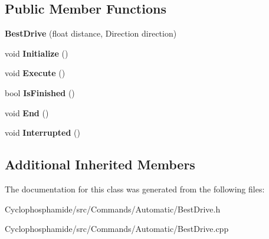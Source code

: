 \subsection*{Public Member Functions}
\begin{DoxyCompactItemize}
\item 
\hypertarget{class_best_drive_aa1ddc3e387fa0eed5941a52dcb4f5dd6}{}{\bfseries Best\+Drive} (float distance, Direction direction)\label{class_best_drive_aa1ddc3e387fa0eed5941a52dcb4f5dd6}

\item 
\hypertarget{class_best_drive_a1837e8ae6f533835175e3014ec959d9b}{}void {\bfseries Initialize} ()\label{class_best_drive_a1837e8ae6f533835175e3014ec959d9b}

\item 
\hypertarget{class_best_drive_a5d3e4b21cfcb5a719a4f3aa347c24784}{}void {\bfseries Execute} ()\label{class_best_drive_a5d3e4b21cfcb5a719a4f3aa347c24784}

\item 
\hypertarget{class_best_drive_a0ddfa6d57679ca2709ff751019102229}{}bool {\bfseries Is\+Finished} ()\label{class_best_drive_a0ddfa6d57679ca2709ff751019102229}

\item 
\hypertarget{class_best_drive_a6aa048014fa7605362f58eb8d92031cc}{}void {\bfseries End} ()\label{class_best_drive_a6aa048014fa7605362f58eb8d92031cc}

\item 
\hypertarget{class_best_drive_ab78dba87be3312f9d3c5327a74b9a75d}{}void {\bfseries Interrupted} ()\label{class_best_drive_ab78dba87be3312f9d3c5327a74b9a75d}

\end{DoxyCompactItemize}
\subsection*{Additional Inherited Members}


The documentation for this class was generated from the following files\+:\begin{DoxyCompactItemize}
\item 
Cyclophosphamide/src/\+Commands/\+Automatic/Best\+Drive.\+h\item 
Cyclophosphamide/src/\+Commands/\+Automatic/Best\+Drive.\+cpp\end{DoxyCompactItemize}
